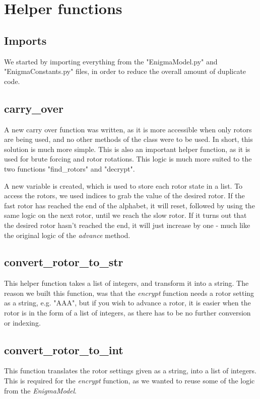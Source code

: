 \documentclass{article}
\begin{document}
\pagebreak
\section{Helper functions}

\subsection{Imports}
We started by importing everything from the "EnigmaModel.py" and 
"EnigmaConstants.py" files, in order to reduce the overall amount of duplicate code.

\subsection{carry\_over}
A new carry over function was written, as it is more accessible when only rotors are being used, and no other methods of the class were to be used.
In short, this solution is much more simple.
This is also an important helper function, as it is used for brute forcing and rotor rotations.
This logic is much more suited to the two functions "find\_rotors" and "decrypt".

A new variable is created, which is used to store each rotor state in a list. To access the rotors, we used indices to grab the value of the desired rotor.
If the fast rotor has reached the end of the alphabet, it will reset, followed by using the same logic on the next rotor, until we reach the slow rotor.
If it turns out that the desired rotor hasn't reached the end, it will just increase by one - much like the original logic of the \textit{advance} method.

\subsection{convert\_rotor\_to\_str}
This helper function takes a list of integers, and transform it into a string. 
The reason we built this function, was that the \textit{encrypt} function needs a rotor setting as a string, e.g. "AAA", but if you wish
to advance a rotor, it is easier when the rotor is in the form of a list of integers, as there has to be no further conversion or indexing.

\subsection{convert\_rotor\_to\_int}
This function translates the rotor settings given as a string, into a list of integers. This is required for the \textit{encrypt} function,
as we wanted to reuse some of the logic from the \textit{EnigmaModel}.
\end{document}
